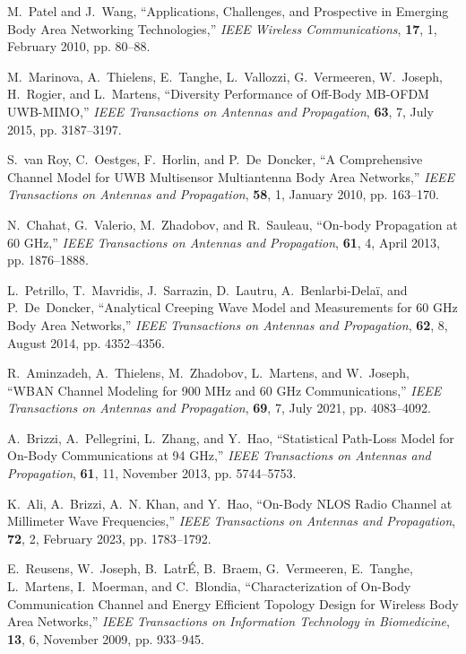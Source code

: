 \documentclass[preprint]{rsl}
\begin{document}
\begin{thebibliography}{9}

M.~Patel and J.~Wang, ``Applications, Challenges, and Prospective in Emerging Body Area Networking Technologies,'' \emph{IEEE Wireless Communications}, \textbf{17}, 1, February 2010, pp. 80--88.

M.~Marinova, A.~Thielens, E.~Tanghe, L.~Vallozzi, G.~Vermeeren, W.~Joseph, H.~Rogier, and L.~Martens, 
``Diversity Performance of Off-Body MB-OFDM UWB-MIMO,'' 
\emph{IEEE Transactions on Antennas and Propagation}, \textbf{63}, 7, July 2015, pp. 3187--3197.

S.~van Roy, C.~Oestges, F.~Horlin, and P.~De~Doncker, 
``A Comprehensive Channel Model for UWB Multisensor Multiantenna Body Area Networks,'' 
\emph{IEEE Transactions on Antennas and Propagation}, \textbf{58}, 1, January 2010, pp. 163--170.

N.~Chahat, G.~Valerio, M.~Zhadobov, and R.~Sauleau, 
``On-body Propagation at 60 GHz,'' 
\emph{IEEE Transactions on Antennas and Propagation}, \textbf{61}, 4, April 2013, pp. 1876--1888.

L.~Petrillo, T.~Mavridis, J.~Sarrazin, D.~Lautru, A.~Benlarbi-Delaï, and P.~De~Doncker, 
``Analytical Creeping Wave Model and Measurements for 60 GHz Body Area Networks,'' 
\emph{IEEE Transactions on Antennas and Propagation}, \textbf{62}, 8, August 2014, pp. 4352--4356.

R.~Aminzadeh, A.~Thielens, M.~Zhadobov, L.~Martens, and W.~Joseph, 
``WBAN Channel Modeling for 900 MHz and 60 GHz Communications,'' 
\emph{IEEE Transactions on Antennas and Propagation}, \textbf{69}, 7, July 2021, pp. 4083--4092.

A.~Brizzi, A.~Pellegrini, L.~Zhang, and Y.~Hao, 
``Statistical Path-Loss Model for On-Body Communications at 94 GHz,'' 
\emph{IEEE Transactions on Antennas and Propagation}, \textbf{61}, 11, November 2013, pp. 5744--5753.

K.~Ali, A.~Brizzi, A.~N. Khan, and Y.~Hao, 
``On-Body NLOS Radio Channel at Millimeter Wave Frequencies,'' 
\emph{IEEE Transactions on Antennas and Propagation}, \textbf{72}, 2, February 2023, pp. 1783--1792.

E.~Reusens, W.~Joseph, B.~LatrÉ, B.~Braem, G.~Vermeeren, E.~Tanghe, L.~Martens, I.~Moerman, and C.~Blondia, 
``Characterization of On-Body Communication Channel and Energy Efficient Topology Design for Wireless Body Area Networks,'' \emph{IEEE Transactions on Information Technology in Biomedicine}, \textbf{13}, 6, November 2009, pp. 933--945.


\end{thebibliography}
\end{document}
